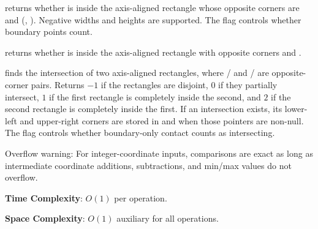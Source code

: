 \begin{compactitem}
  \item {} returns whether  is inside the axis-aligned rectangle whose opposite corners are  and (, ). Negative widths and heights are supported. The  flag controls whether boundary points count.
  \item {} returns whether  is inside the axis-aligned rectangle with opposite corners  and .
  \item {} finds the intersection of two axis-aligned rectangles, where / and / are opposite-corner pairs. Returns $-1$ if the rectangles are disjoint, $0$ if they partially intersect, $1$ if the first rectangle is completely inside the second, and $2$ if the second rectangle is completely inside the first. If an intersection exists, its lower-left and upper-right corners are stored in  and  when those pointers are non-null. The  flag controls whether boundary-only contact counts as intersecting.
\end{compactitem}

Overflow warning: For integer-coordinate inputs, comparisons are exact as long as intermediate coordinate additions, subtractions, and min/max values do not overflow.

\textbf{Time Complexity}: $O(1)$ per operation.

\textbf{Space Complexity}: $O(1)$ auxiliary for all operations.

